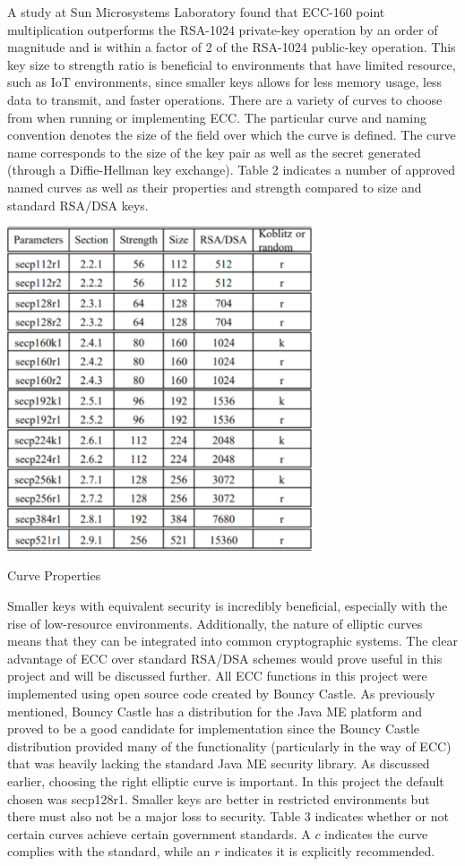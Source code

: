 A study at Sun Microsystems Laboratory found that ECC-160 point multiplication outperforms the RSA-1024 private-key operation by an order of magnitude and is within a factor of 2 of the RSA-1024 public-key operation. This key size to strength ratio is beneficial to environments that have limited resource, such as IoT environments,  since smaller keys allows for less memory usage, less data to transmit, and faster operations. There are a variety of curves to choose from when running or implementing ECC. The particular curve and naming convention denotes the size of the field over which the curve is defined. The curve name corresponds to the size of the key pair as well as the secret generated (through a Diffie-Hellman key exchange). Table 2 indicates a number of approved named curves as well as their properties and strength compared to size and standard RSA/DSA keys.

 
 \begin{table}[t]
	\centering
	\includegraphics[width=9cm,height=0.7\textheight,keepaspectratio]{./figures/table_2}
	\center\caption[font=footnote]{Curve Properties}
\end{table}

Smaller keys with equivalent security is incredibly beneficial, especially with the rise of low-resource environments. Additionally, the nature of elliptic curves means that they can be integrated into common cryptographic systems. The clear advantage of ECC over standard RSA/DSA schemes would prove useful in this project and will be discussed further. 
All ECC functions in this project were implemented using open source code created by Bouncy Castle. As previously mentioned, Bouncy Castle has a distribution for the Java ME platform and proved to be a good candidate for implementation since the Bouncy Castle distribution provided many of the functionality (particularly in the way of ECC) that was heavily lacking the standard Java ME security library. 
As discussed earlier, choosing the right elliptic curve is important. In this project the default chosen was secp128r1. Smaller keys are better in restricted environments but there must also not be a major loss to security. Table 3 indicates whether or not certain curves achieve certain government standards. A $c$ indicates the curve complies with the standard, while an $r$ indicates it is explicitly recommended.

